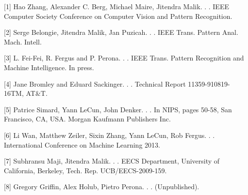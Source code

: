 \documentclass[11pt,letterpaper]{article}
\begin{document}
\begin{thebibliography}{}

[1] Hao Zhang, Alexander C. Berg, Michael Maire, Jitendra Malik.
.
.
 IEEE Computer Society Conference on Computer Vision and Pattern Recognition.

[2] Serge Belongie, Jitendra Malik, Jan Puzicah.
.
.
\newblock IEEE Trans. Pattern Anal. Mach. Intell.

[3] L. Fei-Fei, R. Fergus and P. Perona.
.
.
 IEEE Trans. Pattern Recognition and Machine Intelligence. In press.

[4] Jane Bromley and Eduard Sackinger.
.
.
\newblock Technical Report 11359-910819-16TM, AT$\&$T.

[5] Patrice Simard, Yann LeCun, John Denker.
.
.
\newblock In NIPS, pages 50-58, San Francisco, CA, USA. Morgan Kaufmann Publishers Inc.

[6] Li Wan, Matthew Zeiler, Sixin Zhang, Yann LeCun, Rob Fergus.
.
.
\newblock International Conference on Machine Learning 2013.

[7] Subhransu Maji, Jitendra Malik.
.
.
\newblock EECS Department, University of California, Berkeley, Tech. Rep. UCB/EECS-2009-159.

[8] Gregory Griffin, Alex Holub, Pietro Perona.
.
.
\newblock (Unpublished).


\end{thebibliography}
\end{document}

